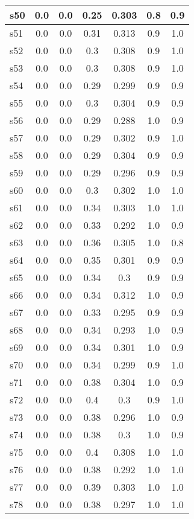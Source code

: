 \documentclass{article}
\begin{document}
\begin{tabular}{|l|c|c|c|c|c|c|}
\hline
s50 &0.0 & 0.0 & 0.25 & 0.303 & 0.8 & 0.9\\
\hline
s51 &0.0 & 0.0 & 0.31 & 0.313 & 0.9 & 1.0\\
\hline
s52 &0.0 & 0.0 & 0.3 & 0.308 & 0.9 & 1.0\\
\hline
s53 &0.0 & 0.0 & 0.3 & 0.308 & 0.9 & 1.0\\
\hline
s54 &0.0 & 0.0 & 0.29 & 0.299 & 0.9 & 0.9\\
\hline
s55 &0.0 & 0.0 & 0.3 & 0.304 & 0.9 & 0.9\\
\hline
s56 &0.0 & 0.0 & 0.29 & 0.288 & 1.0 & 0.9\\
\hline
s57 &0.0 & 0.0 & 0.29 & 0.302 & 0.9 & 1.0\\
\hline
s58 &0.0 & 0.0 & 0.29 & 0.304 & 0.9 & 0.9\\
\hline
s59 &0.0 & 0.0 & 0.29 & 0.296 & 0.9 & 0.9\\
\hline
s60 &0.0 & 0.0 & 0.3 & 0.302 & 1.0 & 1.0\\
\hline
s61 &0.0 & 0.0 & 0.34 & 0.303 & 1.0 & 1.0\\
\hline
s62 &0.0 & 0.0 & 0.33 & 0.292 & 1.0 & 0.9\\
\hline
s63 &0.0 & 0.0 & 0.36 & 0.305 & 1.0 & 0.8\\
\hline
s64 &0.0 & 0.0 & 0.35 & 0.301 & 0.9 & 0.9\\
\hline
s65 &0.0 & 0.0 & 0.34 & 0.3 & 0.9 & 0.9\\
\hline
s66 &0.0 & 0.0 & 0.34 & 0.312 & 1.0 & 0.9\\
\hline
s67 &0.0 & 0.0 & 0.33 & 0.295 & 0.9 & 0.9\\
\hline
s68 &0.0 & 0.0 & 0.34 & 0.293 & 1.0 & 0.9\\
\hline
s69 &0.0 & 0.0 & 0.34 & 0.301 & 1.0 & 0.9\\
\hline
s70 &0.0 & 0.0 & 0.34 & 0.299 & 0.9 & 1.0\\
\hline
s71 &0.0 & 0.0 & 0.38 & 0.304 & 1.0 & 0.9\\
\hline
s72 &0.0 & 0.0 & 0.4 & 0.3 & 0.9 & 1.0\\
\hline
s73 &0.0 & 0.0 & 0.38 & 0.296 & 1.0 & 0.9\\
\hline
s74 &0.0 & 0.0 & 0.38 & 0.3 & 1.0 & 0.9\\
\hline
s75 &0.0 & 0.0 & 0.4 & 0.308 & 1.0 & 1.0\\
\hline
s76 &0.0 & 0.0 & 0.38 & 0.292 & 1.0 & 1.0\\
\hline
s77 &0.0 & 0.0 & 0.39 & 0.303 & 1.0 & 1.0\\
\hline
s78 &0.0 & 0.0 & 0.38 & 0.297 & 1.0 & 1.0\\

\end{tabular}
\end{document}

